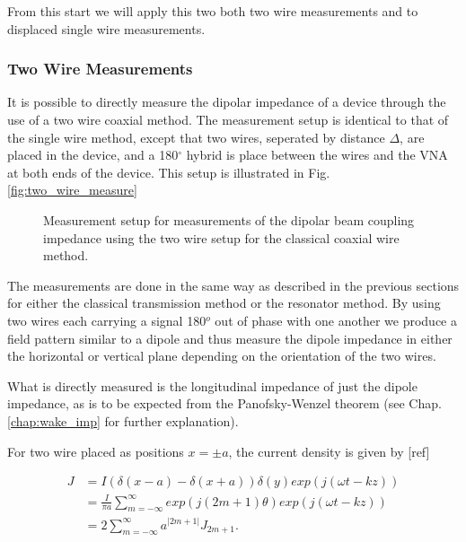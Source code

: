 From this start we will apply this two both two wire measurements and to displaced single wire measurements.

\subsubsection{Two Wire Measurements}

It is possible to directly measure the dipolar impedance of a device through the use of a two wire coaxial method. The measurement setup is identical to that of the single wire method, except that two wires, seperated by distance $\Delta$, are placed in the device, and a 180$^{\circ}$ hybrid is place between the wires and the VNA at both ends of the device. This setup is illustrated in Fig. \ref{fig:two_wire_measure}

\begin{figure}

\label{fig:twowiremeasure}
\caption{Measurement setup for measurements of the dipolar beam coupling impedance using the two wire setup for the classical coaxial wire method.}
\end{figure}

The measurements are done in the same way as described in the previous sections for either the classical transmission method or the resonator method. By using two wires each carrying a signal 180$^{o}$ out of phase with one another we produce a field pattern similar to a dipole and thus measure the dipole impedance in either the horizontal or vertical plane depending on the orientation of the two wires. 

What is directly measured is the longitudinal impedance of just the dipole impedance, as is to be expected from the Panofsky-Wenzel theorem (see Chap. \ref{chap:wake_imp} for further explanation). 

For two wire placed as positions $x = \pm a$, the current density is given by [ref]

\begin{align}
J & =  I \left( \delta \left( x - a \right) - \delta \left( x + a  \right) \right) \delta (y) exp \left( j \left( \omega t - kz \right) \right) \nonumber \\
& =  \frac{I}{\pi a} \displaystyle\sum\limits_{m=-\infty}^{\infty} exp \left(j \left( 2m +1 \right) \theta \right) exp \left( j \left( \omega t - kz \right) \right) \nonumber \\
& =  2\displaystyle\sum\limits_{m=-\infty}^{\infty} a^{|2m + 1 |} J_{2m + 1}.
\end{align}

